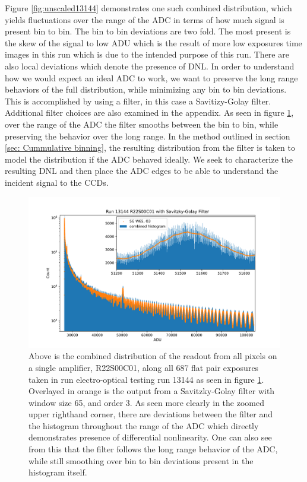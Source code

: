 \documentclass[11pt, letterpaper]{article}
\begin{document}
Figure \ref{fig:unscaled13144} demonstrates one such combined distribution, which yields fluctuations over the range of the ADC in terms of how much signal is present bin to bin. 
The bin to bin deviations are two fold. 
The most present is the skew of the signal to low ADU which is the result of more low exposures time images in this run which is due to the intended purpose of this run. 
There are also local deviations which denote the presence of DNL. 
In order to understand how we would expect an ideal ADC to work, we want to preserve the long range behaviors of the full distribution, while minimizing any bin to bin deviations. 
This is accomplished by using a filter, in this case a Savitizy-Golay filter.
Additional filter choices are also examined in the appendix. 
As seen in figure \ref{fig:filterunscaled13144}, over the range of the ADC the filter smooths between the bin to bin, while preserving the behavior over the long range. 
In the method outlined in section \ref{sec: Cummulative binning}, the resulting distribution from the filter is taken to model the distribution if the ADC behaved ideally. 
We seek to characterize the resulting DNL and then place the ADC edges to be able to understand the incident signal to the CCDs. 

\begin{figure}
    \centering
    \includegraphics[width=0.5\linewidth]{bar2.pdf}
    \caption{Above is the combined distribution of the readout from all pixels on a single amplifier, R22S00C01, along all 687 flat pair exposures taken in run electro-optical testing run 13144 as seen in figure \ref{fig:filterunscaled13144}. Overlayed in orange is the output from a Savitzky-Golay filter with window size 65, and order 3. As seen more clearly in the zoomed upper righthand corner, there are deviations between the filter and the histogram throughout the range of the ADC which directly demonstrates presence of differential nonlinearity. One can also see from this that the filter follows the long range behavior of the ADC, while still smoothing over bin to bin deviations present in the histogram itself.}
    \label{fig:filterunscaled13144}
\end{figure}
\end{document}
